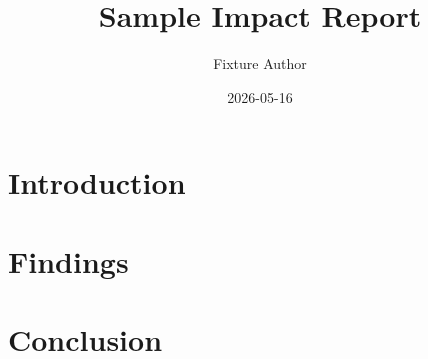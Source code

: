 \documentclass[11pt]{article}
\title{Sample Impact Report}
\author{Fixture Author}
\date{2026-05-16}
\begin{document}
\maketitle

\section{Introduction}


\section{Findings}


\newpage

\section{Conclusion}

\end{document}
